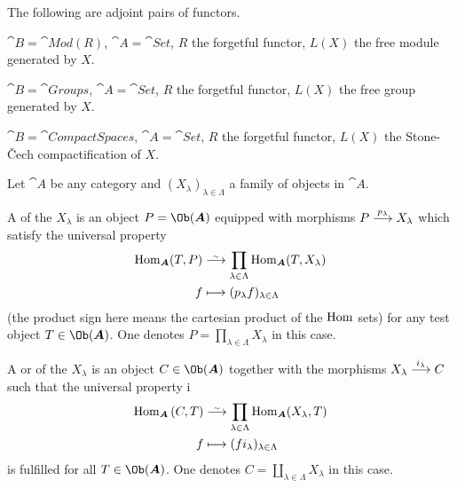 \documentclass[a4paper,parskip=half,numbers=enddot, DIV=12]{scrreprt}
\begin{document}
	 \begin{example}
	 	The following are adjoint pairs of functors.
	 	\begin{alphanumerate}
	 		\item 
	 		${\cat B}=\cat{Mod}(R)$, ${\cat A}=\cat{Set}$, $R$ the forgetful functor, $L(X)$ the free module generated by $X$.
	 		\item
	 		${\cat B}=\cat{Groups}$, ${\cat A}=\cat{Set}$, $R$ the forgetful functor, $L(X)$ the free group generated by $X$.
	 		\item
	 		${\cat B}=\cat{Compact Spaces}$, ${\cat A}=\cat{Set}$, $R$ the forgetful functor, $L(X)$ the Stone-\v Cech compactification of $X$.
	 	\end{alphanumerate}
	 \end{example}
 \begin{defi}
 	Let $\cat A$ be any category and $(X_\lambda)_{\lambda\in\Lambda}$ a family of objects in $\cat A$.
 	\begin{alphanumerate}
 		\item 
 		A  of the $X_\lambda$ is an object $P=\Ob({\cat A})$ equipped with morphisms $P\morphism[p_\lambda] X_\lambda$ which satisfy the universal property
 		\begin{align*}
 		\Hom_{\cat A}(T, P) &\isomorphism \prod_{\lambda\in\Lambda} \Hom_{\cat A}(T,X_\lambda)\\
 		f&\longmapsto (p_\lambda f)_{\lambda\in\Lambda}
 		\end{align*} 
 		(the product sign here means the cartesian product of the $\operatorname{Hom}$ sets) for any test object $T\in\Ob(\cat A)$. One denotes $P=\prod_{\lambda\in\Lambda}X_\lambda$ in this case.
 		\item A  or  of the $X_\lambda$ is an object $C\in\Ob({\cat A})$ together with the morphisms $X_\lambda \morphism[i_\lambda] C$ such that the universal property i
 		\begin{align*}
 		\Hom_{\cat A}\left(C, T\right) &\isomorphism \prod_{\lambda\in\Lambda} \Hom_{\cat A}(X_\lambda, T)\\
 		f &\longmapsto (fi_\lambda)_{\lambda\in\Lambda}
 		\end{align*}
 		is fulfilled for all $T\in\Ob(\cat A)$. One denotes $C=\coprod_{\lambda\in\Lambda} X_\lambda$ in this case.
 	\end{alphanumerate}
 \end{defi}
\end{document}
